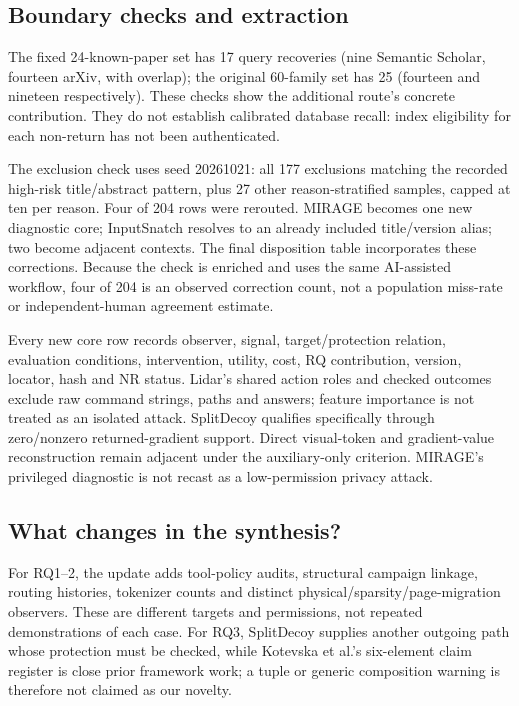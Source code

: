 \subsection{Boundary checks and extraction}
The fixed 24-known-paper set has 17 query recoveries (nine Semantic Scholar, fourteen arXiv, with overlap); the original 60-family set has 25 (fourteen and nineteen respectively). These checks show the additional route's concrete contribution. They do not establish calibrated database recall: index eligibility for each non-return has not been authenticated.

The exclusion check uses seed 20261021: all 177 exclusions matching the recorded high-risk title/abstract pattern, plus 27 other reason-stratified samples, capped at ten per reason. Four of 204 rows were rerouted. MIRAGE becomes one new diagnostic core; InputSnatch resolves to an already included title/version alias; two become adjacent contexts. The final disposition table incorporates these corrections. Because the check is enriched and uses the same AI-assisted workflow, four of 204 is an observed correction count, not a population miss-rate or independent-human agreement estimate.

Every new core row records observer, signal, target/protection relation, evaluation conditions, intervention, utility, cost, RQ contribution, version, locator, hash and NR status. Lidar's shared action roles and checked outcomes exclude raw command strings, paths and answers; feature importance is not treated as an isolated attack. SplitDecoy qualifies specifically through zero/nonzero returned-gradient support. Direct visual-token and gradient-value reconstruction remain adjacent under the auxiliary-only criterion. MIRAGE's privileged diagnostic is not recast as a low-permission privacy attack.

\subsection{What changes in the synthesis?}
For RQ1--2, the update adds tool-policy audits, structural campaign linkage, routing histories, tokenizer counts and distinct physical/sparsity/page-migration observers. These are different targets and permissions, not repeated demonstrations of each case. For RQ3, SplitDecoy supplies another outgoing path whose protection must be checked, while Kotevska et al.'s six-element claim register is close prior framework work; a tuple or generic composition warning is therefore not claimed as our novelty.

